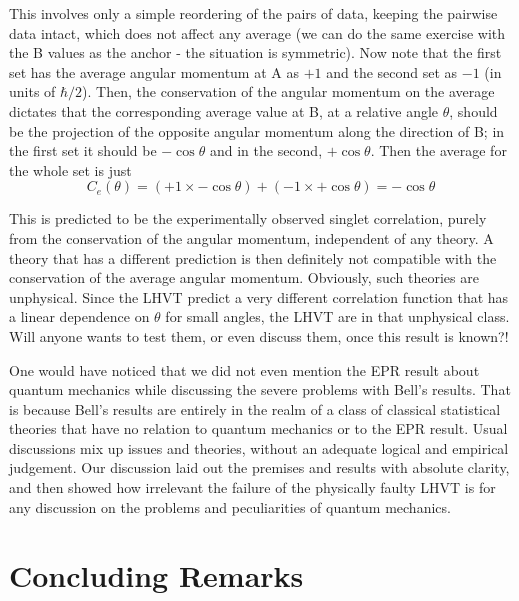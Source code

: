 This involves only a simple reordering of the pairs of data, keeping the pairwise data intact, which does not affect any average (we can do the same exercise with the B values as the anchor - the situation is symmetric). Now note that the first set has the average angular
momentum at A as $+1$ and the second set as $-1$ (in units of $\hbar/2$). Then, the conservation
of the angular momentum on the average dictates that the corresponding average value at
B, at a relative angle $\theta$, should be the projection of the opposite angular momentum along
the direction of B; in the first set it should be $- \cos \theta$ and in the second, $+ \cos \theta$. Then the
average for the whole set is just
\begin{equation*}
C_e  (\theta) = (+1 \times -\cos \theta) + (-1 \times + \cos \theta )  = - \cos \theta \tag{44}
\end{equation*}

This is predicted to be the experimentally observed singlet correlation, purely from the
conservation of the angular momentum, independent of any theory. A theory that has a
different prediction is then definitely not compatible with the conservation of the average
angular momentum. Obviously, such theories are unphysical. Since the LHVT predict a
very different correlation function that has a linear dependence on $\theta$ for small angles, the
LHVT are in that unphysical class. Will anyone wants to test them, or even discuss them,
once this result is known?!

One would have noticed that we did not even mention the EPR result about quantum
mechanics while discussing the severe problems with Bell's results. That is because Bell's
results are entirely in the realm of a class of classical statistical theories that have no relation
to quantum mechanics or to the EPR result. Usual discussions mix up issues and theories,
without an adequate logical and empirical judgement. Our discussion laid out the premises
and results with absolute clarity, and then showed how irrelevant the failure of the physically
faulty LHVT is for any discussion on the problems and peculiarities of quantum mechanics.


\section{Concluding Remarks}%

